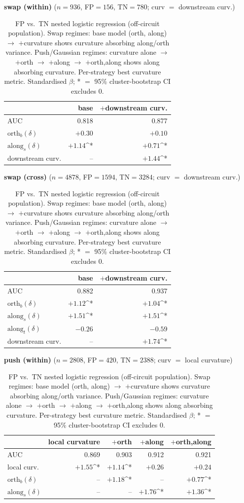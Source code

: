 \begin{table}[t]
\centering
\caption{FP vs.\ TN nested logistic regression (off-circuit population). Swap regimes: base model (orth, along) $\to$ $+$curvature shows curvature absorbing along/orth variance. Push/Gaussian regimes: curvature alone $\to$ $+$orth $\to$ $+$along $\to$ $+$orth,along shows along absorbing curvature. Per-strategy best curvature metric. Standardised $\beta$; * $=$ 95\% cluster-bootstrap CI excludes 0.}
\label{tab:m3l-curv}
\small

\medskip
\textbf{swap (within)} ($n=936$, FP$=156$, TN$=780$; curv $=$ downstream curv.)

\begin{tabular}{l r r }
\toprule
 & base & $+$downstream curv. \\
\midrule
AUC & 0.818 & 0.877 \\
$\mathrm{orth}_b(\delta)$ & $+0.30$ & $+0.10$ \\
$\mathrm{along}_s(\delta)$ & $+1.14$^* & $+0.71$^* \\
downstream curv. & -- & $+1.44$^* \\
\bottomrule
\end{tabular}

\medskip
\textbf{swap (cross)} ($n=4878$, FP$=1594$, TN$=3284$; curv $=$ downstream curv.)

\begin{tabular}{l r r }
\toprule
 & base & $+$downstream curv. \\
\midrule
AUC & 0.882 & 0.937 \\
$\mathrm{orth}_b(\delta)$ & $+1.12$^* & $+1.04$^* \\
$\mathrm{along}_s(\delta)$ & $+1.51$^* & $+1.51$^* \\
$\mathrm{along}_t(\delta)$ & $-0.26$ & $-0.59$ \\
downstream curv. & -- & $+1.74$^* \\
\bottomrule
\end{tabular}

\medskip
\textbf{push (within)} ($n=2808$, FP$=420$, TN$=2388$; curv $=$ local curvature)

\begin{tabular}{l r r r r }
\toprule
 & local curvature & $+$orth & $+$along & $+$orth,along \\
\midrule
AUC & 0.869 & 0.903 & 0.912 & 0.921 \\
local curv. & $+1.55$^* & $+1.14$^* & $+0.26$ & $+0.24$ \\
$\mathrm{orth}_b(\delta)$ & -- & $+1.18$^* & -- & $+0.77$^* \\
$\mathrm{along}_s(\delta)$ & -- & -- & $+1.76$^* & $+1.36$^* \\
\bottomrule
\end{tabular}


\end{table}
